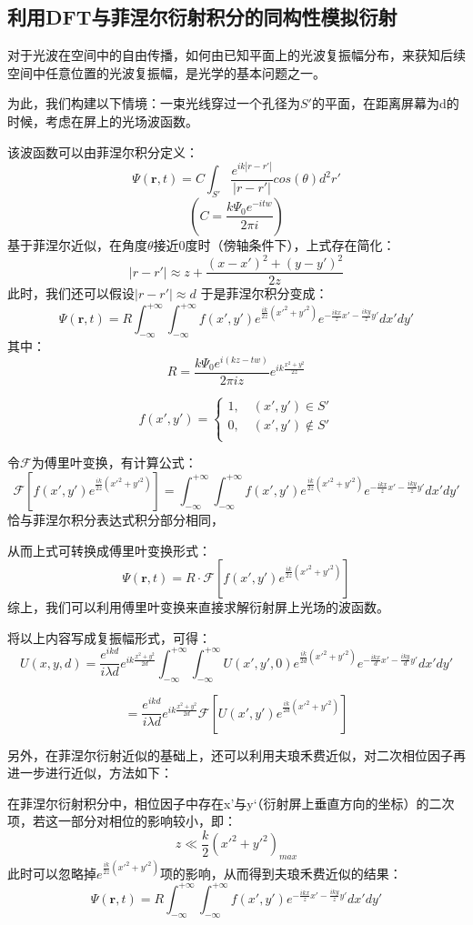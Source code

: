\documentclass[a4paper,12pt]{article}
\begin{document}
	
\newpage
	\subsection{利用DFT与菲涅尔衍射积分的同构性模拟衍射}
\noindent 对于光波在空间中的自由传播，如何由已知平面上的光波复振幅分布，来获知后续空间中任意位置的光波复振幅，是光学的基本问题之一。

\noindent 为此，我们构建以下情境：一束光线穿过一个孔径为$S'$的平面，在距离屏幕为d的时候，考虑在屏上的光场波函数。

\noindent 该波函数可以由菲涅尔积分定义：
$$\Psi(\pmb r,t)=C\int_{S'}\frac{e^{ik|r-r'|}}{|r-r'|}cos(\theta)d^2r'$$
$$(C=\frac{k\Psi_0e^{-itw}}{2\pi i})$$
基于菲涅尔近似，在角度$\theta$接近0度时（傍轴条件下），上式存在简化：
$$
|r-r'|\approx z+\frac{(x-x')^2+(y-y')^2}{2z}
$$
此时，我们还可以假设$|r-r'|\approx d$
于是菲涅尔积分变成：
$$
\Psi(\pmb r,t)=R\int_{-\infty}^{+\infty}\int_{-\infty}^{+\infty}f(x',y')e^{\frac{ik}{2z}(x'^2+y'^2)}e^{-\frac{ikx}{z}x'-\frac{iky}{z}y'}dx'dy'
$$
其中：
$$
R=\frac{k\Psi_0e^{i(kz-tw)}}{2\pi iz}e^{ik\frac{x^2+y^2}{2z}}
$$

$$
f(x',y')=\begin{cases}
	1 ,\quad (x',y')\in S'\\
	0,\quad(x',y')\notin S'\\
\end{cases}
$$

\noindent 令$\mathcal F$为傅里叶变换，有计算公式：
$$
\mathcal F[f(x',y')e^{\frac{ik}{2z}(x'^2+y'^2)}]=\int_{-\infty}^{+\infty}\int_{-\infty}^{+\infty}f(x',y')e^{\frac{ik}{2z}(x'^2+y'^2)}e^{-\frac{ikx}{z}x'-\frac{iky}{z}y'}dx'dy'
$$
恰与菲涅尔积分表达式积分部分相同，

\noindent 从而上式可转换成傅里叶变换形式：
$$
\Psi(\pmb r,t)=R\cdot \mathcal F[f(x',y')e^{\frac{ik}{2z}(x'^2+y'^2)}]
$$
综上，我们可以利用傅里叶变换来直接求解衍射屏上光场的波函数。

\noindent 将以上内容写成复振幅形式，可得：
$$
U(x,y,d)=\frac{e^{ikd}}{i\lambda d}e^{ik\frac{x^2+y^2}{2d}}\int_{-\infty}^{+\infty}\int_{-\infty}^{+\infty}U(x',y',0)e^{\frac{ik}{2d}(x'^2+y'^2)}e^{-\frac{ikx}{d}x'-\frac{iky}{d}y'}dx'dy'
$$

$$
=\frac{e^{ikd}}{i\lambda d}e^{ik\frac{x^2+y^2}{2d}}\mathcal F[U(x',y')e^{\frac{ik}{2d}(x'^2+y'^2)}]
$$

\noindent 另外，在菲涅尔衍射近似的基础上，还可以利用夫琅禾费近似，对二次相位因子再进一步进行近似，方法如下：

\noindent 在菲涅尔衍射积分中，相位因子中存在x'与y‘（衍射屏上垂直方向的坐标）的二次项，若这一部分对相位的影响较小，即：
$$
z\ll\frac{k}{2}(x'^2+y'^2)_{max}
$$
此时可以忽略掉$e^{\frac{ik}{2z}(x'^2+y'^2)}$项的影响，从而得到夫琅禾费近似的结果：
$$
\Psi(\pmb r,t)=R\int_{-\infty}^{+\infty}\int_{-\infty}^{+\infty}f(x',y')e^{-\frac{ikx}{z}x'-\frac{iky}{z}y'}dx'dy'
$$
\end{document}
